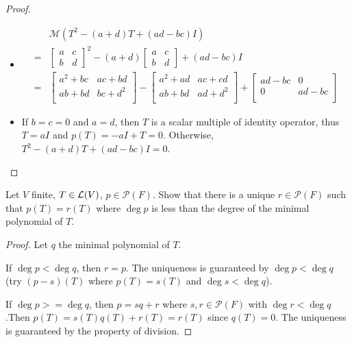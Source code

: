 \documentclass[../main.tex]{subfiles}
\begin{document}
\begin{proof}
  \def\MT{\begin{bmatrix} a & c \\ b & d \end{bmatrix}}
  ~
  \begin{itemize}
    \item \begin{align*}
             & \mathcal{M}(T^2 - (a + d) T + (ad - bc)I) \\
            =& \MT^2 - (a + d)\MT + (ad - bc)I \\
            =& \begin{bmatrix} 
              a^2 + bc & ac + bd \\
              ab + bd & bc + d^2 \\
            \end{bmatrix} - \begin{bmatrix}
              a^2 + ad & ac + cd \\
              ab + bd & ad + d^2 \\
            \end{bmatrix}
            + \begin{bmatrix}
              ad - bc & 0 \\
              0 & ad - bc \\
            \end{bmatrix}
          \end{align*}
    \item If $b = c = 0$ and $a = d$, then $T$ is a scalar multiple of identity operator,
          thus $T = aI$ and $p(T) = -aI + T = 0$.
          Otherwise, $T^2 - (a + d)T + (ad - bc)I = 0$.
  \end{itemize}
\end{proof}

\setcounter{exercise}{12}
\begin{exercise}
  Let $V$ finite, $T \in \mathcal{L}(V)$, $p \in \mathcal{P}(F)$.
  Show that there is a unique $r \in \mathcal{P}(F)$ such that $p(T) = r(T)$
  where $\deg p$ is less than the degree of the minimal polynomial of $T$.
\end{exercise}
\begin{proof}
  Let $q$ the minimal polynomial of $T$.

  If $\deg p < \deg q$, then $r = p$. The uniqueness is guaranteed by
  $\deg p < \deg q$ (try $(p - s)(T)$ where $p(T) = s(T)$ and $\deg s < \deg q$).

  If $\deg p >= \deg q$, then $p = sq + r$ where $s, r \in \mathcal{P}(F)$
  with $\deg r < \deg q$.Then $p(T) = s(T)q(T) + r(T) = r(T)$ since $q(T) = 0$.
  The uniqueness is guaranteed by the property of division.
\end{proof}
\end{document}
